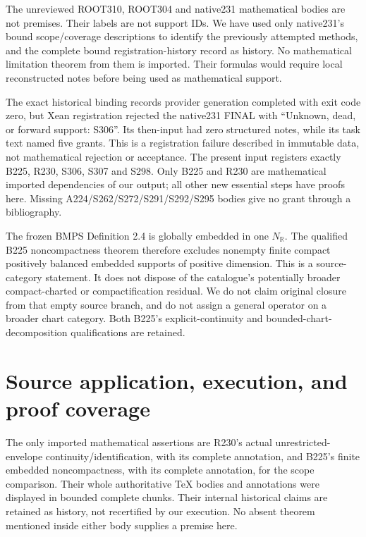 \documentclass[11pt]{article}
\newcommand{\R}{\mathbb R}
\begin{document}
The unreviewed ROOT310, ROOT304 and native231 mathematical bodies are not premises. Their labels are not support IDs. We have used only native231's bound scope/coverage descriptions to identify the previously attempted methods, and the complete bound registration-history record as history. No mathematical limitation theorem from them is imported. Their formulas would require local reconstructed notes before being used as mathematical support.

The exact historical binding records provider generation completed with exit code zero, but Xean registration rejected the native231 FINAL with ``Unknown, dead, or forward support: S306''. Its then-input had zero structured notes, while its task text named five grants. This is a registration failure described in immutable data, not mathematical rejection or acceptance. The present input registers exactly B225, R230, S306, S307 and S298. Only B225 and R230 are mathematical imported dependencies of our output; all other new essential steps have proofs here. Missing A224/S262/S272/S291/S292/S295 bodies give no grant through a bibliography.

The frozen BMPS Definition 2.4 is globally embedded in one $N_\R$. The qualified B225 noncompactness theorem therefore excludes nonempty finite compact positively balanced embedded supports of positive dimension. This is a source-category statement. It does not dispose of the catalogue's potentially broader compact-charted or compactification residual. We do not claim original closure from that empty source branch, and do not assign a general operator on a broader chart category. Both B225's explicit-continuity and bounded-chart-decomposition qualifications are retained.

\section{Source application, execution, and proof coverage}
The only imported mathematical assertions are R230's actual unrestricted-envelope continuity/identification, with its complete annotation, and B225's finite embedded noncompactness, with its complete annotation, for the scope comparison. Their whole authoritative TeX bodies and annotations were displayed in bounded complete chunks. Their internal historical claims are retained as history, not recertified by our execution. No absent theorem mentioned inside either body supplies a premise here.
\end{document}

